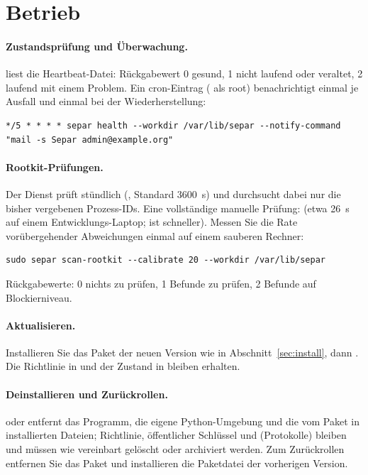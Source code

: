\documentclass[11pt,a4paper]{article}
\begin{document}
\section{Betrieb}
\label{sec:ops}

\paragraph{Zustandsprüfung und Überwachung.}  liest die Heartbeat-Datei:
Rückgabewert 0 gesund, 1 nicht laufend oder veraltet, 2 laufend mit einem Problem. Ein
cron-Eintrag ( als root) benachrichtigt einmal je Ausfall und einmal bei der
Wiederherstellung:
\begin{lstlisting}
*/5 * * * * separ health --workdir /var/lib/separ --notify-command "mail -s Separ admin@example.org"
\end{lstlisting}

\paragraph{Rootkit-Prüfungen.} Der Dienst prüft stündlich (, Standard
3600~s) und durchsucht dabei nur die bisher vergebenen Prozess-IDs. Eine vollständige manuelle
Prüfung:  (etwa 26~s auf einem Entwicklungs-Laptop;
 ist schneller). Messen Sie die Rate vorübergehender Abweichungen einmal
auf einem sauberen Rechner:
\begin{lstlisting}
sudo separ scan-rootkit --calibrate 20 --workdir /var/lib/separ
\end{lstlisting}
Rückgabewerte: 0 nichts zu prüfen, 1 Befunde zu prüfen, 2 Befunde auf Blockierniveau.

\paragraph{Aktualisieren.} Installieren Sie das Paket der neuen Version wie in
Abschnitt~\ref{sec:install}, dann . Die Richtlinie in
 und der Zustand in  bleiben erhalten.

\paragraph{Deinstallieren und Zurückrollen.}  oder  entfernt das Programm, die eigene Python-Umgebung und die vom Paket in 
installierten Dateien; Richtlinie, öffentlicher Schlüssel und  (Protokolle)
bleiben und müssen wie vereinbart gelöscht oder archiviert werden. Zum Zurückrollen entfernen Sie
das Paket und installieren die Paketdatei der vorherigen Version.
\end{document}
